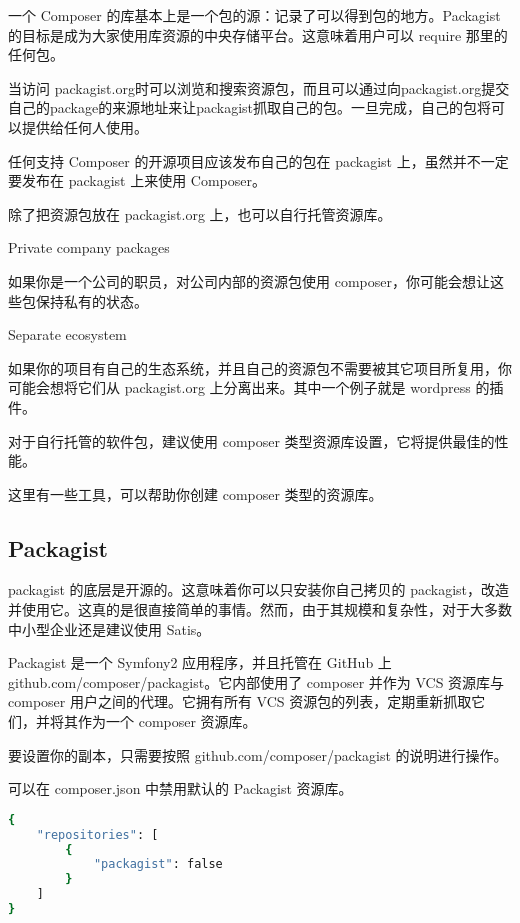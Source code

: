 一个 Composer 的库基本上是一个包的源：记录了可以得到包的地方。Packagist 的目标是成为大家使用库资源的中央存储平台。这意味着用户可以 require 那里的任何包。

当访问 packagist.org时可以浏览和搜索资源包，而且可以通过向packagist.org提交自己的package的来源地址来让packagist抓取自己的包。一旦完成，自己的包将可以提供给任何人使用。

任何支持 Composer 的开源项目应该发布自己的包在 packagist 上，虽然并不一定要发布在 packagist 上来使用 Composer。

除了把资源包放在 packagist.org 上，也可以自行托管资源库。

\begin{compactitem}
\item Private company packages

如果你是一个公司的职员，对公司内部的资源包使用 composer，你可能会想让这些包保持私有的状态。

\item Separate ecosystem

如果你的项目有自己的生态系统，并且自己的资源包不需要被其它项目所复用，你可能会想将它们从 packagist.org 上分离出来。其中一个例子就是 wordpress 的插件。
\end{compactitem}


对于自行托管的软件包，建议使用 composer 类型资源库设置，它将提供最佳的性能。

这里有一些工具，可以帮助你创建 composer 类型的资源库。

\subsection{Packagist}

packagist 的底层是开源的。这意味着你可以只安装你自己拷贝的 packagist，改造并使用它。这真的是很直接简单的事情。然而，由于其规模和复杂性，对于大多数中小型企业还是建议使用 Satis。

Packagist 是一个 Symfony2 应用程序，并且托管在 GitHub 上 github.com/composer/packagist。它内部使用了 composer 并作为 VCS 资源库与 composer 用户之间的代理。它拥有所有 VCS 资源包的列表，定期重新抓取它们，并将其作为一个 composer 资源库。

要设置你的副本，只需要按照 github.com/composer/packagist 的说明进行操作。

可以在 composer.json 中禁用默认的 Packagist 资源库。

\begin{lstlisting}[language=bash]
{
    "repositories": [
        {
            "packagist": false
        }
    ]
}
\end{lstlisting}






